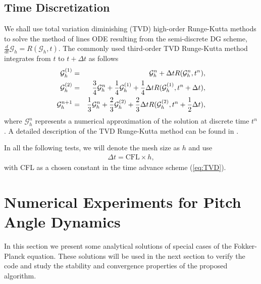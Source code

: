 \documentclass[preprint,11pt]{elsarticle}
\begin{document}
\subsection{Time Discretization}
We shall use total variation diminishing (TVD) high-order Runge-Kutta methods to solve the method of lines ODE resulting from the semi-discrete DG scheme, $\frac{d}{dt}\mathcal{G}_h=R(\mathcal{G}_h,t)$. %
The commonly used third-order TVD Runge-Kutta method integrates from $t$ to $t+\Delta t$ as follows %
\begin{eqnarray}
\mathcal{G}_h^{(1)}&=&\mathcal{G}_h^n+\Delta tR(\mathcal{G}_h^n,t^n),\notag\\
\mathcal{G}_h^{(2)}&=&\frac{3}{4}\mathcal{G}_h^n+\frac{1}{4}\mathcal{G}_h^{(1)}+\frac{1}{4}\Delta tR(\mathcal{G}_h^{(1)},t^n+\Delta t),\notag\\
\mathcal{G}_h^{n+1}&=&\frac{1}{3}\mathcal{G}_h^n+\frac{2}{3}\mathcal{G}_h^{(2)}+\frac{2}{3}\Delta tR(\mathcal{G}_h^{(2)},t^n+\frac{1}{2}\Delta t),\label{eq:TVD}
\end{eqnarray}
where $\mathcal{G}_h^n$ represents a numerical approximation of the solution at discrete time $t^n$. A detailed description of the TVD Runge-Kutta method can be found in \cite{ShuOsher1988}.

 In all the following tests, we will denote the mesh size as $h$ and use
\begin{eqnarray*}
\Delta t = \mbox{CFL} \times h,
\end{eqnarray*}
with CFL as a chosen constant in the time advance scheme (\ref{eq:TVD}).

\section{Numerical Experiments for Pitch Angle Dynamics}\label{Sect:AnSol}

In this section we present some analytical solutions of special cases of the Fokker-Planck equation. These solutions will be used in the next section to verify the code and study the stability and convergence properties of the proposed algorithm. 
\end{document}
